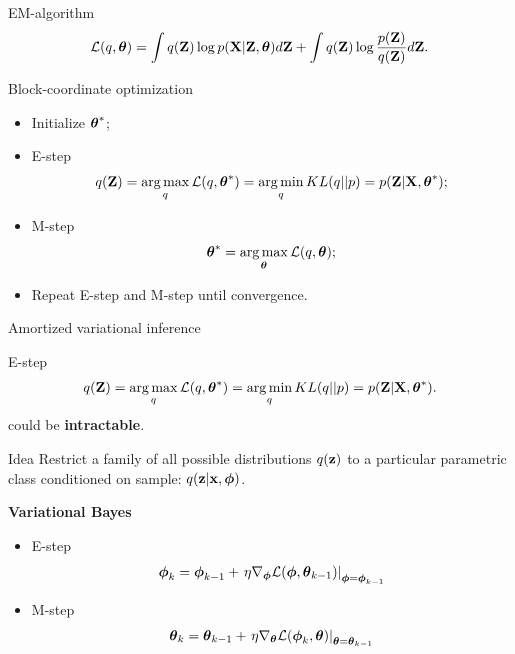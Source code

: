 \begin{frame}{EM-algorithm}
	\[
		\mathcal{L} (q, \boldsymbol{\theta})  = \int q(\mathbf{Z}) \log p(\mathbf{X} | \mathbf{Z}, \boldsymbol{\theta}) d\mathbf{Z} + \int q(\mathbf{Z}) \log \frac{p(\mathbf{Z})}{q(\mathbf{Z})}d\mathbf{Z}.
	\]
	\begin{block}{Block-coordinate optimization}
	\begin{itemize}
		\item Initialize $\boldsymbol{\theta}^*$;
		\item E-step
		\[
			q(\mathbf{Z}) = \operatorname*{arg\,max}_q \mathcal{L} (q, \boldsymbol{\theta}^*) = \operatorname*{arg\,min}_q KL(q || p) =
			 p(\mathbf{Z}| \mathbf{X}, \boldsymbol{\theta}^*);
		\]
		\item M-step
		\[
			\boldsymbol{\theta}^* = \operatorname*{arg\,max}_{\boldsymbol{\theta}} \mathcal{L} (q, \boldsymbol{\theta});
		\]
		\item Repeat E-step and M-step until convergence.
	\end{itemize}
	\end{block}
\end{frame}
\begin{frame}{Amortized variational inference}
    \begin{block}{E-step}
    \vspace{-0.3cm}
    \[
		q(\mathbf{Z}) = \operatorname*{arg\,max}_q \mathcal{L} (q, \boldsymbol{\theta}^*) = \operatorname*{arg\,min}_q KL(q || p) =
		 p(\mathbf{Z}| \mathbf{X}, \boldsymbol{\theta}^*).
	\]
	could be \textbf{intractable}.
    \end{block}
	\begin{block}{Idea}
	Restrict a family of all possible distributions $q(\mathbf{z})$ to a particular parametric class conditioned on sample: $q(\mathbf{z}|\mathbf{x}, \boldsymbol{\phi})$.
	\end{block}
	
	\textbf{Variational Bayes}
	\begin{itemize}
		\item E-step
		\[
		\boldsymbol{\phi}_k = \boldsymbol{\phi}_{k-1} + \left.\eta \nabla_{\boldsymbol{\phi}} \mathcal{L}(\boldsymbol{\phi}, \boldsymbol{\theta}_{k-1})\right|_{\boldsymbol{\phi}=\boldsymbol{\phi}_{k-1}}
		\]
		\item M-step
		\[
		\boldsymbol{\theta}_k = \boldsymbol{\theta}_{k-1} + \left.\eta \nabla_{\boldsymbol{\theta}} \mathcal{L}(\boldsymbol{\phi}_k, \boldsymbol{\theta})\right|_{\boldsymbol{\theta}=\boldsymbol{\theta}_{k-1}}
		\]
	\end{itemize}
\end{frame}
